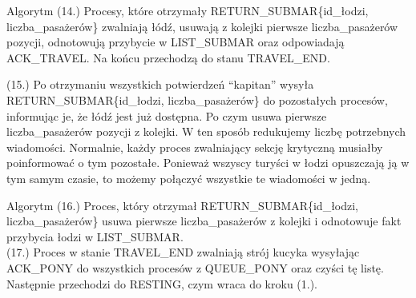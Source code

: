 \documentclass{beamer}
\begin{document}
\begin{frame}{Algorytm}
    \internallinenumbers
    (14.) Procesy, które otrzymały RETURN\_SUBMAR\{id\_łodzi, liczba\_pasażerów\} zwalniają łódź, usuwają z kolejki pierwsze liczba\_pasażerów pozycji, odnotowują przybycie w LIST\_SUBMAR oraz odpowiadają ACK\_TRAVEL. Na końcu przechodzą do stanu TRAVEL\_END.

    (15.) Po otrzymaniu wszystkich potwierdzeń ``kapitan'' wysyła RETURN\_SUBMAR\{id\_łodzi, liczba\_pasażerów\} do pozostałych procesów, informując je, że łódź jest już dostępna. Po czym usuwa pierwsze liczba\_pasażerów pozycji z kolejki. W ten sposób redukujemy liczbę potrzebnych wiadomości. Normalnie, każdy proces zwalniający sekcję krytyczną musiałby poinformować o tym pozostałe. Ponieważ wszyscy turyści w łodzi opuszczają ją w tym samym czasie, to możemy połączyć wszystkie te wiadomości w jedną.
\end{frame}

\begin{frame}{Algorytm}
    \internallinenumbers
    (16.) Proces, który otrzymał RETURN\_SUBMAR\{id\_łodzi, liczba\_pasażerów\} usuwa pierwsze liczba\_pasażerów z kolejki i odnotowuje fakt przybycia łodzi w LIST\_SUBMAR.\\
    (17.) Proces w stanie TRAVEL\_END zwalniają strój kucyka wysyłając ACK\_PONY do wszystkich procesów z QUEUE\_PONY oraz czyści tę listę. Następnie przechodzi do RESTING, czym wraca do kroku (1.).
\end{frame}
\end{document}
